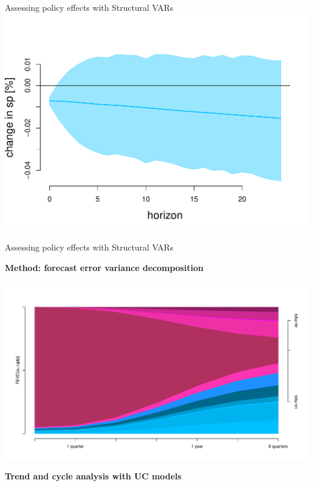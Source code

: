\documentclass[notes,blackandwhite,mathsans]{beamer}
\begin{document}
\begin{frame}{Assessing policy effects with Structural VARs}
\includegraphics[scale=0.3]{grphs/06irf-73}

\end{frame}



\begin{frame}{Assessing policy effects with Structural VARs}

\textbf{Method: forecast error variance decomposition}

\includegraphics[scale=0.35]{grphs/06fevd}

\end{frame}





{
\begin{frame}

\begin{adjustwidth}{-0.6cm}{0cm}
\vspace{8.3cm}\Large
\textbf{{\color{mcxs2}Trend and cycle analysis with } {\color{mcxs1}UC models}}
\end{adjustwidth}

\end{frame}
}
\end{document}
